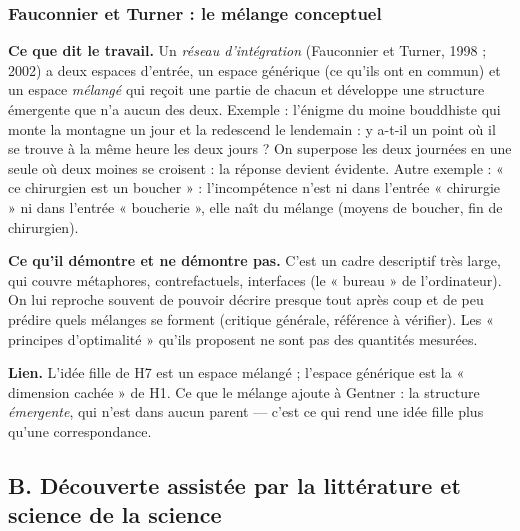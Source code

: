 \documentclass[a4paper,11pt]{article}
\newcommand{\cours}[1]{\par\smallskip\textbf{\textsf{#1}}\enspace}
\begin{document}
\subsubsection{Fauconnier et Turner : le mélange conceptuel}
\cours{Ce que dit le travail.} Un \emph{réseau d'intégration} (Fauconnier et Turner, 1998 ; 2002) a deux espaces d'entrée, un espace générique (ce qu'ils ont en commun) et un espace \emph{mélangé} qui reçoit une partie de chacun et développe une structure émergente que n'a aucun des deux. Exemple : l'énigme du moine bouddhiste qui monte la montagne un jour et la redescend le lendemain : y a-t-il un point où il se trouve à la même heure les deux jours ? On superpose les deux journées en une seule où deux moines se croisent : la réponse devient évidente. Autre exemple : « ce chirurgien est un boucher » : l'incompétence n'est ni dans l'entrée « chirurgie » ni dans l'entrée « boucherie », elle naît du mélange (moyens de boucher, fin de chirurgien).
\cours{Ce qu'il démontre et ne démontre pas.} C'est un cadre descriptif très large, qui couvre métaphores, contrefactuels, interfaces (le « bureau » de l'ordinateur). On lui reproche souvent de pouvoir décrire presque tout après coup et de peu prédire quels mélanges se forment (critique générale, référence à vérifier). Les « principes d'optimalité » qu'ils proposent ne sont pas des quantités mesurées.
\cours{Lien.} L'idée fille de H7 est un espace mélangé ; l'espace générique est la « dimension cachée » de H1. Ce que le mélange ajoute à Gentner : la structure \emph{émergente}, qui n'est dans aucun parent — c'est ce qui rend une idée fille plus qu'une correspondance.

\subsection*{B. Découverte assistée par la littérature et science de la science}
\end{document}
